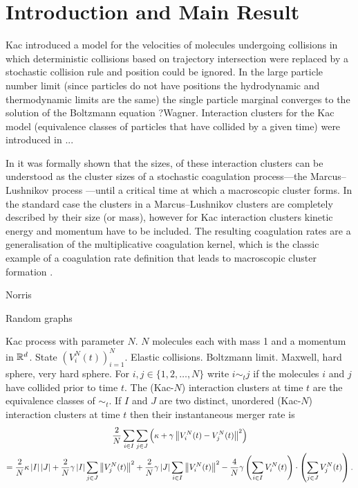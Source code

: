 \section{Introduction and Main Result}

Kac \cite{K56} introduced a model for the velocities of molecules undergoing collisions in which deterministic collisions based on trajectory intersection were replaced by a stochastic collision rule and position could be ignored.
In the large particle number limit (since particles do not have positions the hydrodynamic and thermodynamic limits are the same) the single particle marginal converges to the solution of the Boltzmann equation ?Wagner.
Interaction clusters for the Kac model (equivalence classes of particles that have collided by a given time) were introduced in \cite{GKSZ08} ...

In \cite{PSW17} it was formally shown that the sizes, of these interaction clusters can be understood as the cluster sizes of a stochastic coagulation process---the Marcus--Lushnikov process \cite{L78}---until a critical time at which a macroscopic cluster forms.
In the standard case the clusters in a Marcus--Lushnikov clusters are completely described by their size (or mass), however for Kac interaction clusters kinetic energy and momentum have to be included.
The resulting coagulation rates are a generalisation of the multiplicative coagulation kernel, which is the classic example of a coagulation rate definition that leads to macroscopic cluster formation \cite{L78,A99}.

Norris

Random graphs

Kac process with parameter $N$.
$N$ molecules each with mass 1 and a momentum in $\mathbb{R}^d$.
State $\left(V_i^N(t)\right)_{i=1}^N$.
Elastic collisions.
Boltzmann limit.
Maxwell, hard sphere, very hard sphere.
For $i,j\in \{1,2,\dotsc, N \}$ write $i \sim_t j$ if the molecules $i$ and $j$ have collided prior to time $t$.
The (Kac-$N$) interaction clusters at time $t$ are the equivalence classes of $\sim_t$.
If $I$ and $J$ are two distinct, unordered (Kac-$N$) interaction clusters at time $t$ then their instantaneous merger rate is
\begin{multline}\label{e:cluster-merge-rate}
    \frac2N\sum_{i\in I}\sum_{j\in J}
     \left(\kappa + \gamma \left\lVert{V_i^N(t) - V_j^N(t)}\right\rVert^2 \right)\\
    =
    \frac2N\kappa \left\lvert{I}\right\rvert\left\lvert{J}\right\rvert
    +\frac2N\gamma \left\lvert{I}\right\rvert \sum_{j\in J}\left\lVert{V_j^N(t)}\right\rVert^2
    +\frac2N\gamma \left\lvert{J}\right\rvert \sum_{i\in I}\left\lVert{V_i^N(t)}\right\rVert^2
    -\frac4N\gamma \left(\sum_{i\in I}V_i^N(t)\right)\cdot
    \left(\sum_{j\in J}V_j^N(t)\right).
\end{multline}